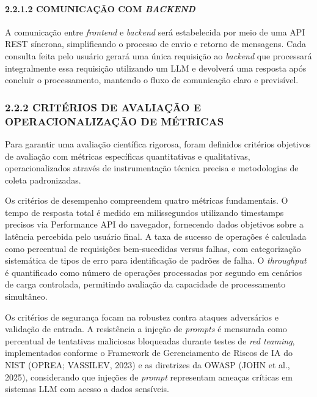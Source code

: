 \documentclass[
]{article}
\begin{document}
\paragraph{\texorpdfstring{2.2.1.2 COMUNICAÇÃO COM
\emph{BACKEND}}{2.2.1.2 COMUNICAÇÃO COM BACKEND}}\label{comunicauxe7uxe3o-com-backend}

A comunicação entre \emph{frontend} e \emph{backend} será estabelecida
por meio de uma API REST síncrona, simplificando o processo de envio e
retorno de mensagens. Cada consulta feita pelo usuário gerará uma única
requisição ao \emph{backend} que processará integralmente essa
requisição utilizando um LLM e devolverá uma resposta após concluir o
processamento, mantendo o fluxo de comunicação claro e previsível.

\subsubsection{2.2.2 CRITÉRIOS DE AVALIAÇÃO E OPERACIONALIZAÇÃO DE
MÉTRICAS}\label{crituxe9rios-de-avaliauxe7uxe3o-e-operacionalizauxe7uxe3o-de-muxe9tricas}

Para garantir uma avaliação científica rigorosa, foram definidos
critérios objetivos de avaliação com métricas específicas quantitativas
e qualitativas, operacionalizados através de instrumentação técnica
precisa e metodologias de coleta padronizadas.

Os critérios de desempenho compreendem quatro métricas fundamentais. O
tempo de resposta total é medido em milissegundos utilizando timestamps
precisos via Performance API do navegador, fornecendo dados objetivos
sobre a latência percebida pelo usuário final. A taxa de sucesso de
operações é calculada como percentual de requisições bem-sucedidas
versus falhas, com categorização sistemática de tipos de erro para
identificação de padrões de falha. O \emph{throughput} é quantificado
como número de operações processadas por segundo em cenários de carga
controlada, permitindo avaliação da capacidade de processamento
simultâneo.

Os critérios de segurança focam na robustez contra ataques adversários e
validação de entrada. A resistência a injeção de \emph{prompts} é
mensurada como percentual de tentativas maliciosas bloqueadas durante
testes de \emph{red teaming}, implementados conforme o Framework de
Gerenciamento de Riscos de IA do NIST (OPREA; VASSILEV, 2023) e as
diretrizes da OWASP (JOHN et al., 2025), considerando que injeções de
\emph{prompt} representam ameaças críticas em sistemas LLM com acesso a
dados sensíveis.
\end{document}
